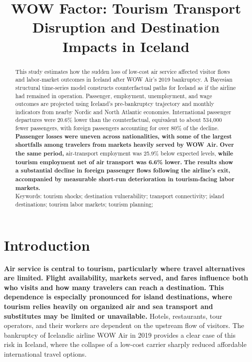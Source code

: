 \documentclass[12pt]{article}
\title{WOW Factor: Tourism Transport Disruption and Destination Impacts in Iceland}
\author{}
\date{}
\begin{document}
 

\hypersetup{pageanchor=false}

\maketitle 

\thispagestyle{empty} \clearpage

\begin{abstract}
This study estimates how the sudden loss of low-cost air service affected visitor flows and labor-market outcomes in Iceland after WOW Air's 2019 bankruptcy. A Bayesian structural time-series model constructs counterfactual paths for Iceland as if the airline had remained in operation. Passenger, employment, unemployment, and wage outcomes are projected using Iceland's pre-bankruptcy trajectory and monthly indicators from nearby Nordic and North Atlantic economies. International passenger departures were 20.6\% lower than the counterfactual, equivalent to about 534,000 fewer passengers, with foreign passengers accounting for over 80\% of the decline. \textbf{Passenger losses were uneven across nationalities, with some of the largest shortfalls among travelers from markets heavily served by WOW Air.} \textbf{Over the same period,} air-transport employment was 25.9\% below expected levels, \textbf{while tourism employment net of air transport was 6.6\% lower.} \textbf{The results show a substantial decline in foreign passenger flows following the airline's exit, accompanied by measurable short-run deterioration in tourism-facing labor markets.}\\
Keywords: tourism shocks; destination vulnerability; transport connectivity; island destinations; tourism labor markets; tourism planning;
\end{abstract}

\section{Introduction}\label{sec:introduction}
\textbf{Air service is central to tourism, particularly where travel alternatives are limited. Flight availability, markets served, and fares influence both who visits and how many travelers can reach a destination. This dependence is especially pronounced for island destinations, where tourism relies heavily on organized air and sea transport and substitutes may be limited or unavailable.} Hotels, restaurants, tour operators, and their workers are dependent on the upstream flow of visitors. The bankruptcy of Icelandic airline WOW Air in 2019 provides a clear case of this risk in Iceland, where the collapse of a low-cost carrier sharply reduced affordable international travel options.
\end{document}
